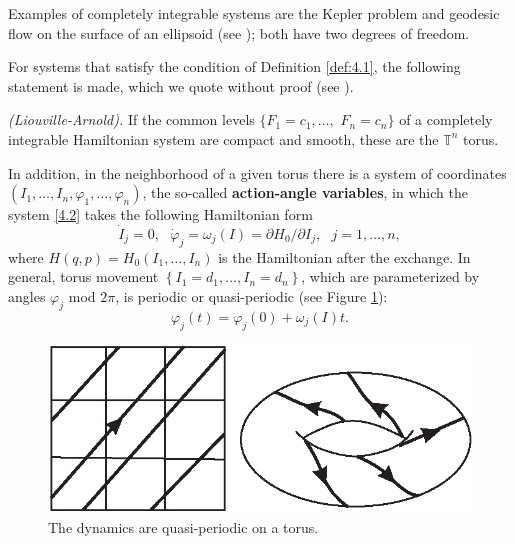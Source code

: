 Examples of completely integrable systems are the Kepler problem and geodesic flow on the surface of an ellipsoid (see \cite{Ar3}); both have two degrees of freedom.

For systems that satisfy the condition of Definition \ref{def:4.1}, the following statement is made, which we quote without proof (see \cite{Ar3}).

\begin{theorem} \emph{(Liouville-Arnold).}\label{theo:4.4}
	If the common levels $\{F_{1}=c_{1},\ldots ,$ $F_{n}=c_{n}\}$ of a completely integrable Hamiltonian system are compact and smooth, these are the $\mathbb{T}^n$ torus.
	
	In addition, in the neighborhood of a given torus there is a system of coordinates $\left( I_{1},\ldots ,I_{n},\varphi _{1},\ldots ,\varphi
	_{n}\right) $, the so-called \textbf{action-angle variables}, in which the system \eqref{4.2} takes the following Hamiltonian form 
	\begin{equation}
	\label{4.3}
	\dot{I}_{j}=0,\text{ \ \ }\dot{\varphi}_{j}=\omega _{j}(I)=\partial
	H_{0}/\partial I_{j},\text{ \ \ \ \ }j=1,\ldots ,n,
	\end{equation}
	where $H(q,p)=H_{0}(I_{1},\ldots ,I_{n})$ is the Hamiltonian after the exchange. In general, torus movement $\left\{
	I_{1}=d_{1},\ldots ,I_{n}=d_{n}\right\} $, which are parameterized by angles $\varphi _{j}$ mod $2\pi $, is periodic or quasi-periodic (see Figure \ref{fig:4.1}):
	$$
	\varphi _{j}(t)=\varphi _{j}(0)+\omega _{j}(I)t.
	$$
\end{theorem}

\begin{figure}[!ht]
	\centering
	\includegraphics [scale=1.4]{jtr41}
	\caption{The dynamics are quasi-periodic on a torus.}
	\label{fig:4.1}
\end{figure}

